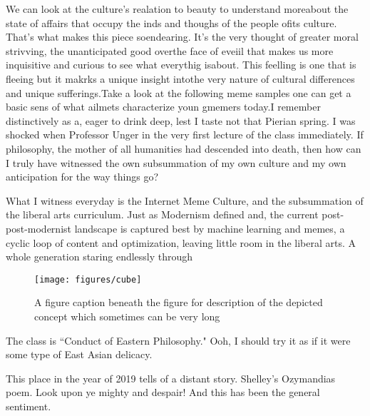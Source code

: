 \documentclass[12pt,letterpaper]{article}
\newif\ifdraft
\begin{document}
We can look at the culture's realation to beauty to understand moreabout the state of affairs that occupy the inds and thoughs of the people ofits  culture. That's what makes this piece soendearing.  It's the very thought of greater moral strivving, the unanticipated good overthe face of eveiil that makes  us more inquisitive and curious to see what everythig isabout.  This feelling is one that is fleeing but it makrks a unique insight intothe very nature of cultural differences and unique sufferings.Take a look at the following  meme samples one can get a basic sens of what  ailmets characterize youn gmemers today.I remember distinctively as a, eager to drink deep, lest I taste not that Pierian spring.  I was shocked when Professor Unger in the very first lecture of the class immediately.  If philosophy, the mother of all humanities had descended into death, then how can I truly have witnessed the own subsummation of my own culture and my own anticipation for the way things go?

 What I witness everyday is the Internet Meme Culture, and the subsummation of the liberal arts curriculum.  Just as Modernism defined and, the current post-post-modernist landscape is captured best by machine learning and memes, a cyclic loop of content and optimization, leaving little room in the liberal arts.  A whole generation staring endlessly through 

\begin{figure}[!h]
	\centering
	\texttt{[image: figures/cube]}
	\caption{A figure caption beneath the figure for description of the depicted concept which sometimes can be very long}
	\label{ft_fig_firstfig}
\end{figure}





\ifdraft
My class schedule this entire semester had taken on an interesting flavor -- it was going to be taught.  The benefits of, it's like growing up with two parents who aren't divorced.


I can name of few dynamic duels that I know off -- Joe Blitzstein and Susan Murphy in the Statistics Department, James Mickens and Eddie Kohler in the CS department, whose operating systems class starts at three that very same day.
  \fi


The class is ``Conduct of Eastern Philosophy."  Ooh, I should try it as if it were some type of East Asian delicacy.

This place in the year of 2019 tells of a distant story.  Shelley's Ozymandias poem.  Look upon ye mighty and despair!  And this has been the general sentiment.
\end{document}
